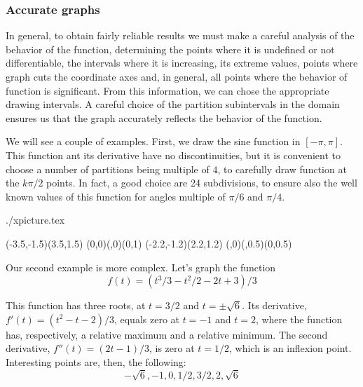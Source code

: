 \documentclass{article}
\newcounter{exem}\stepcounter{exem}
\newenvironment{Exemple}{%
   \VerbatimEnvironment\begin{VerbatimOut}{./xpicture\theexem.tex}}{%
   \end{VerbatimOut}
   \par\noindent
   \marginpar{\fbox{Ex. \theexem}}\fbox{\begin{minipage}{\linewidth}
      \begin{minipage}{\linewidth}
         \setlength{\parindent}{2ex}
         \bigskip\par
         \catcode`\%=14
         
      \end{minipage}\medskip\par
      \hspace*{0.125\linewidth}\rule{0.75\linewidth}{0.4pt}\par\medskip
      \small
      \VerbatimInput{./xpicture\theexem.tex}
   \end{minipage}}\stepcounter{exem}\par\bigskip\noindent}
\begin{document}
\subsubsection{Accurate graphs}
In general, to obtain fairly reliable results we must make
 a careful analysis of the behavior of the function,
determining the points where it is undefined or not differentiable,
 the intervals where it is increasing, its extreme values,
points where graph cuts the coordinate axes and, in general,
 all points where the behavior of
function is significant.
From this information, we can chose the appropriate
drawing intervals.
A careful choice of the partition
subintervals in the domain ensures us
that the graph accurately reflects the behavior of the function.

We will see a couple of examples.
First, we draw the sine function in $[-\pi,\pi]$.
This function ant its derivative have no discontinuities,
but it is convenient to choose a number of partitions
being multiple of $4$, to carefully draw
function at the
$k\pi/2$ points.
In fact, a good choice are 24 subdivisions,
to ensure also the well known values of this function
for angles
multiple of $\pi/6$ and $\pi/4$.
\begin{Exemple}
\setlength{\unitlength}{2cm}%

\begin{center}
\begin{Picture}(-3.5,-1.5)(3.5,1.5)
{(0,0)(\numberHALFPI,0)(0,1)
\makenolabels
\cartesianaxes(-2.2,-1.2)(2.2,1.2)}
\printxlabel{-\numberPI}{-\pi}
\printxlabel{\numberPI}{\pi}
   \PlotFunction[24]{\SINfunction}{-\numberPI}{\numberPI}
\renewcommand{\axeslabelcolor}{red}
\Polyline(\numberSIXTHPI,0)(\numberSIXTHPI,0.5)(0,0.5)
\end{Picture}
\end{center}
\end{Exemple}

Our second example is more complex. Let's graph the function
\[
f(t)=(t^3/3-t^2/2-2t+3)/3
\]

This function has three roots, at
$t=3/2$ and $t=\pm\sqrt{6}$.
Its derivative, $f'(t)=(t^2-t-2)/3$, equals zero at
$t=-1$ and $t=2$, where the function has, respectively,
a relative maximum and a relative minimum.
 The second derivative, $f''(t)=(2t-1)/3$,
 is zero at $t=1/2$, which is an inflexion point.
Interesting points are, then, the following:
\[
     -\sqrt{6},-1,0,1/2,3/2,2,\sqrt{6}
\]
\end{document}

